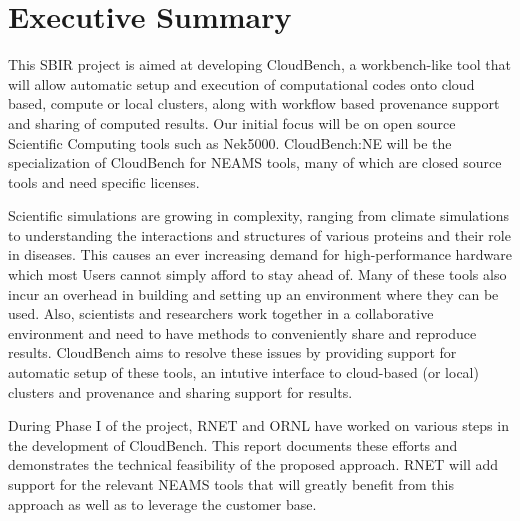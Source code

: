 \section*{Executive Summary}
This SBIR project is aimed at developing CloudBench, a workbench-like tool that 
will allow automatic setup and execution of computational codes onto cloud 
based, compute or local clusters, along with workflow based provenance support 
and sharing of computed results. Our initial focus will be on open source 
Scientific Computing tools such as Nek5000. CloudBench:NE will be the 
specialization of CloudBench for NEAMS tools, many of which are closed source 
tools and need specific licenses.

Scientific simulations are growing in complexity, ranging from climate 
simulations to understanding the interactions and structures of various 
proteins and their role in diseases. This causes an ever increasing demand for 
high-performance hardware which most Users cannot simply afford to stay ahead 
of. Many of these tools also incur an overhead in building and setting up an 
environment where they can be used. Also, scientists and researchers work 
together in a collaborative environment and need to have methods to 
conveniently share and reproduce results. CloudBench aims to resolve these 
issues by providing support for automatic setup of these tools, an intutive 
interface to cloud-based (or local) clusters and provenance and sharing support 
for results.

During Phase I of the project, RNET and ORNL have worked on various steps in 
the development of CloudBench. This report documents these efforts and 
demonstrates the technical feasibility of the proposed approach. RNET will add 
support for the relevant NEAMS tools that will greatly benefit from this 
approach as well as to leverage the customer base.


